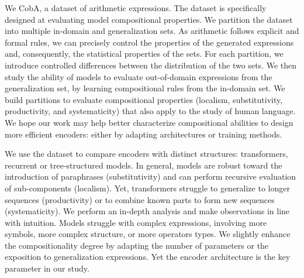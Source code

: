 We  CobA, a dataset  of arithmetic expressions. The dataset is specifically designed at evaluating model compositional properties. We partition the dataset into multiple in-domain and generalization sets. As arithmetic follows explicit and formal rules, we can precisely control the properties of the generated expressions and, consequently, the statistical properties of the sets. For each partition, we introduce controlled differences between the distribution of the two sets. We then study the ability of models to evaluate out-of-domain expressions from the generalization set, by learning compositional rules from the in-domain set. We build partitions to evaluate compositional properties (localism, substitutivity, productivity, and systematicity) that also apply to the study of human language. We hope our work may help better characterize compositional abilities to design more efficient encoders: either by adapting architectures or training methods.

We use the dataset to compare encoders with distinct structures: transformers, recurrent or tree-structured models. In general, models are robust toward the introduction of paraphrases (substitutivity) and can perform recursive evaluation of sub-components (localism). Yet, transformers struggle to generalize to longer sequences (productivity) or to combine known parts to form new sequences (systematicity). We perform an in-depth analysis and make observations in line with intuition. Models struggle with complex expressions, involving more symbols, more complex structure, or more operators types. We slightly enhance the compositionality degree by adapting the number of parameters or the exposition to generalization expressions. Yet the encoder architecture is the key parameter in our study. 

